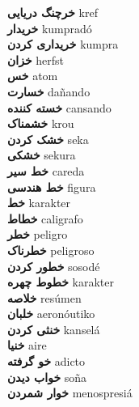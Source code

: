 \textbf{ خرچنگ دریایی  } kref \\
\textbf{ خریدار  } kumpradó \\
\textbf{ خریداری کردن  } kumpra \\
\textbf{ خزان  } herfst \\
\textbf{ خس  } atom \\
\textbf{ خسارت  } dañando \\
\textbf{ خسته کننده  } cansando \\
\textbf{ خشمناک  } krou \\
\textbf{ خشک کردن  } seka \\
\textbf{ خشکی  } sekura \\
\textbf{ خط سیر  } careda \\
\textbf{ خط هندسی  } figura \\
\textbf{ خط  } karakter \\
\textbf{ خطاط  } caligrafo \\
\textbf{ خطر  } peligro \\
\textbf{ خطرناک  } peligroso \\
\textbf{ خطور کردن  } sosodé \\
\textbf{ خطوط چهره  } karakter \\
\textbf{ خلاصه  } resúmen \\
\textbf{ خلبان  } aeronóutiko \\
\textbf{ خنثی کردن  } kanselá \\
\textbf{ خنیا  } aire \\
\textbf{ خو گرفته  } adicto \\
\textbf{ خواب دیدن  } soña \\
\textbf{ خوار شمردن  } menospresiá \\
